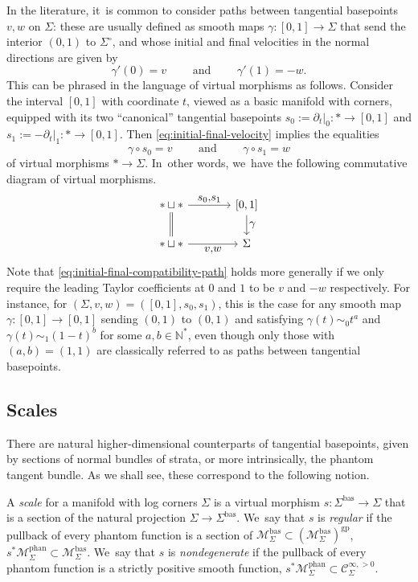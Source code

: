 \documentclass[JEP,XML,SOM,Unicode,NoFloatCountersInSection,published]{cedram}
\let\tst\textstyle
\theoremstyle{definition}
\theoremstyle{remark}
\newenvironment{remark}
  {\pushQED{\qed}\renewcommand{\qedsymbol}{$\lozenge$}\remarkx}
  {\popQED\endremarkx}
\let\defn\emph
\newcommand{\NN}{\mathbb{N}}
\newcommand{\cMbas}{\mathscr{M}^{\mathrm{bas}}}
\newcommand{\cMphan}{\mathscr{M}^{\mathrm{phan}}}
\newcommand{\Cinfpos}[1]{\mathscr{C}^{\infty, > 0}_{#1}}
\newcommand{\Sig}{\Sigma}
\newcommand{\bas}[1]{{#1}^{\mathrm{bas}}}
\newcommand{\Sigbas}{\bas{\Sig}}
\newcommand{\intSig}{\Sigma^\circ}
\begin{document}
\begin{remark}
In the literature, it~is common to consider paths between tangential basepoints $v, w$ on $\Sig$: these are usually defined as smooth maps $\gamma : [0,1] \to \Sig$ that send the interior $(0,1)$ to $\intSig$, and whose initial and final velocities in the normal directions are given by
\begin{equation}\label{eq:initial-final-velocity}
\gamma'(0)=v\qquad \mbox{ and } \qquad \gamma'(1)=-w.
\end{equation}
This can be phrased in the language of virtual morphisms as follows. Consider the interval $[0,1]$ with coordinate $t$, viewed as a basic manifold with corners, equipped with its two ``canonical'' tangential basepoints $s_0:=\partial_t|_0:*\to [0,1]$ and $s_1:=-\partial_t|_1:*\to [0,1]$. Then \eqref{eq:initial-final-velocity} implies the equalities
\begin{equation}\label{eq:initial-final-compatibility-path}
\gamma\circ s_0=v \qquad \mbox{ and } \qquad \gamma\circ s_1=w
\end{equation}
of virtual morphisms $*\to\Sig$. In~other words, we~have the following commutative diagram of virtual morphisms.
\begin{equation}\label{eq:diagram-path-between-tangential-basepoints}
\begin{tikzcd}
*\sqcup * \ar[r,"\tst s_0{,}s_1"] \ar[d,equal] &[.5cm] [0,1] \ar[d,"\tst \gamma"] \\
*\sqcup * \ar[r,"\tst v{,}w"'] & \Sig
\end{tikzcd}
\end{equation}
Note that \eqref{eq:initial-final-compatibility-path} holds more generally if we only require the leading Taylor coefficients at $0$ and $1$ to be $v$ and $-w$ respectively. For instance, for $(\Sig,v,w)=([0,1],s_0,s_1)$, this is the case for any smooth map $\gamma:[0,1]\to [0,1]$ sending $(0,1)$ to $(0,1)$ and satisfying $\gamma(t)\sim_0 t^a$ and $\gamma(t)\sim_1(1-t)^b$ for some $a,b\in\NN^*$, even though only those with $(a,b)=(1,1)$ are classically referred to as paths between tangential basepoints.
\end{remark}

\subsection{Scales}\label{sec:scales}
There are natural higher-dimensional counterparts of tangential basepoints, given by sections of normal bundles of strata, or more intrinsically, the phantom tangent bundle. As we shall see, these correspond to the following notion.
\begin{definition}\label{def:scale}
A \defn{scale} for a manifold with log corners $\Sig$ is a virtual morphism $s \colon \Sigbas \to \Sig$ that is a section of the natural projection $\Sig\to \Sigbas$. We~say that $s$ is \defn{regular} if the pullback of every phantom function is a section of $\cMbas_\Sigma\subset (\cMbas_\Sigma)^{\mathrm{gp}}$, \ie $s^*\cMphan_\Sig\subset \cMbas_\Sig$. We~say that $s$ is \defn{nondegenerate} if the pullback of every phantom function is a strictly positive smooth function, \ie $s^*\cMphan_{\Sig}\subset \Cinfpos{\Sig}$.
\end{definition}
\end{document}
